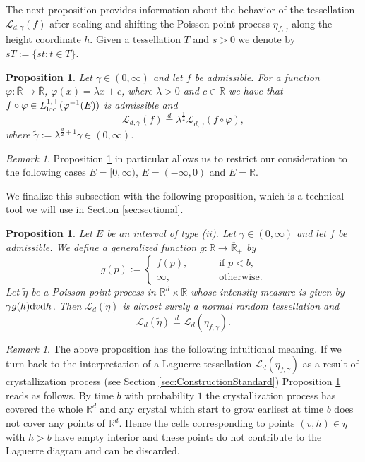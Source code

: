 \documentclass[11pt,a4paper]{article}
\theoremstyle{plain}
\newtheorem{proposition}[theorem]{Proposition}
\theoremstyle{definition}
\theoremstyle{remark}
\newtheorem{remark}[theorem]{Remark}
\def\RR{\mathbb{R}}
\def\cL{\mathcal{L}}
\newcommand{\dd}{{\rm d}}
\begin{document}
The next proposition provides information about the behavior of the tessellation $\cL_{d,\gamma}(f)$ after scaling and shifting the Poisson point process $\eta_{f,\gamma}$ along the height coordinate $h$. Given a tessellation $T$ and $s>0$ we denote by $sT:=\{st:t\in T\}$.

\begin{proposition}\label{prop:compwlin}
    Let $\gamma\in (0,\infty)$ and let $f$ be admissible. For a function  
    $\varphi\colon \overline{\RR}\to \overline{\RR}$, $\varphi(x)=\lambda x+c$, where $\lambda>0$ and $c\in \RR$ we have that $f \circ \varphi\in L_{\rm loc}^{1,+}(\varphi^{-1}(E))$ is admissible and 
    \[
        \cL_{d,\gamma}(f)\overset{d}{=}\lambda^{\frac{1}{2}}\cL_{d,\widetilde{\gamma}}(f\circ \varphi),
    \]
    where $\widetilde{\gamma}:=\lambda^{\frac{d}{2}+1}\gamma\in(0,\infty)$. 
\end{proposition}

\begin{remark}
    Proposition \ref{prop:compwlin} in particular allows us to restrict our consideration to the following cases $E=[0,\infty)$, $E=(-\infty, 0)$ and $E=\RR$. 
\end{remark}

We finalize this subsection with the following proposition, which is a technical tool we will use in Section \ref{sec:sectional}.

\begin{proposition}\label{prop:trunc}
    Let $E$ be an interval of type (ii). Let $\gamma\in (0,\infty)$ and let $f$ be admissible. We define a generalized function $g\colon\RR\to\overline{\RR}_+$ by 
    \[
        g(p):=\begin{cases}
            f(p),\qquad&\text{ if }p<b,\\
            \infty,\qquad&\text{ otherwise}.
        \end{cases}
    \]
    Let $\widetilde{\eta}$ be a Poisson point process in $\RR^d \times \RR$ whose intensity measure is given by $\gamma g(h) \dd v\dd h$. Then $\cL_{d}(\widetilde{\eta})$ is almost surely a normal random tessellation and
    \[
        \cL_{d}(\widetilde{\eta}) \overset{d}{=} \cL_{d}(\eta_{f,\gamma}).
    \]
\end{proposition}

\begin{remark}
    The above proposition has the following intuitional meaning. If we turn back to the interpretation of a Laguerre tessellation $\cL_d(\eta_{f,\gamma})$ as a result of crystallization process (see Section \ref{sec:ConstructionStandard}) Proposition \ref{prop:trunc} reads as follows. By time $b$ with probability $1$ the crystallization process has covered the whole $\RR^d$ and any crystal which start to grow earliest at time $b$ does not cover any points of $\RR^d$. Hence the cells corresponding to points $(v,h)\in \eta$ with $h>b$ have empty interior and these points do not contribute to the Laguerre diagram and can be discarded.
\end{remark}
\end{document}
